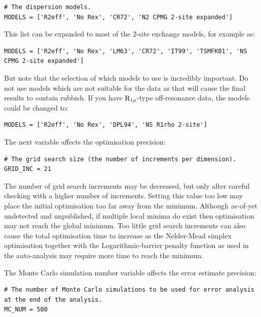 \begin{lstlisting}[firstnumber=14]
# The dispersion models.
MODELS = ['R2eff', 'No Rex', 'CR72', 'N2 CPMG 2-site expanded']
\end{lstlisting}

This list can be expanded to most of the 2-site exchange models, for example as:

\begin{lstlisting}[numbers=none]
MODELS = ['R2eff', 'No Rex', 'LM63', 'CR72', 'IT99', 'TSMFK01', 'NS CPMG 2-site expanded']
\end{lstlisting}

But note that the selection of which models to use is incredibly important.
Do not use models which are not suitable for the data as that will cause the final results to contain rubbish.
If you have $\mathrm{R}_{1\rho}$-type off-resonance data, the models could be changed to:

\begin{lstlisting}[numbers=none]
MODELS = ['R2eff', 'No Rex', 'DPL94', 'NS R1rho 2-site']
\end{lstlisting}

The next variable affects the optimisation precision:

\begin{lstlisting}[firstnumber=17]
# The grid search size (the number of increments per dimension).
GRID_INC = 21
\end{lstlisting}

The number of grid search increments may be decreased, but only after careful checking with a higher number of increments.  Setting this value too low may place the initial optimisation too far away from the minimum.  Although as-of-yet undetected and unpublished, if multiple local minima do exist then optimisation may not reach the global minimum.  Too little grid search increments can also cause the total optimisation time to increase as the Nelder-Mead simplex optimisation together with the Logarithmic-barrier penalty function as used in the auto-analysis may require more time to reach the minimum.

The Monte Carlo simulation number  variable affects the error estimate precision:

\begin{lstlisting}[firstnumber=20]
# The number of Monte Carlo simulations to be used for error analysis at the end of the analysis.
MC_NUM = 500
\end{lstlisting}

